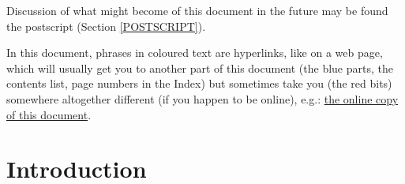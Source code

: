 \documentclass[11pt]{article}
\begin{document}
Discussion of what might become of this document in the future may be found the postscript (Section \ref{POSTSCRIPT}).

In this document, phrases in coloured text are hyperlinks, like on a web page, which will usually get you to another part of this document (the blue parts, the contents list, page numbers in the Index) but sometimes take you (the red bits) somewhere altogether different (if you happen to be online), e.g.: \href{http://rbjones.com/rbjpub/pp/doc/t050.pdf}{the online copy of this document}.

\cite{rbjt000}

\section{Introduction}
\end{document}
